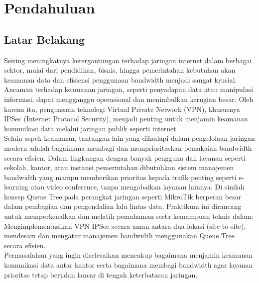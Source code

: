\section{Pendahuluan}
\subsection{Latar Belakang}
Seiring meningkatnya ketergantungan terhadap jaringan internet dalam berbagai sektor, mulai dari pendidikan, bisnis, hingga pemerintahan kebutuhan akan keamanan data dan efisiensi penggunaan bandwidth menjadi sangat krusial. Ancaman terhadap keamanan jaringan, seperti penyadapan data atau manipulasi informasi, dapat mengganggu operasional dan menimbulkan kerugian besar. Oleh karena itu, penguasaan teknologi Virtual Private Network (VPN), khususnya IPSec (Internet Protocol Security), menjadi penting untuk menjamin keamanan komunikasi data melalui jaringan publik seperti internet. \\ Selain aspek keamanan, tantangan lain yang dihadapi dalam pengelolaan jaringan modern adalah bagaimana membagi dan memprioritaskan pemakaian bandwidth secara efisien. Dalam lingkungan dengan banyak pengguna dan layanan seperti sekolah, kantor, atau instansi pemerintahan dibutuhkan sistem manajemen bandwidth yang mampu memberikan prioritas kepada trafik penting seperti e-learning atau video conference, tanpa mengabaikan layanan lainnya. Di sinilah konsep Queue Tree pada perangkat jaringan seperti MikroTik berperan besar dalam pembagian dan pengendalian lalu lintas data. Praktikum ini dirancang untuk memperkenalkan dan melatih pemahaman serta kemampuan teknis dalam: Mengimplementasikan VPN IPSec secara aman antara dua lokasi (site-to-site), mendesain dan mengatur manajemen bandwidth menggunakan Queue Tree secara efisien. \\ Permasalahan yang ingin diselesaikan mencakup bagaimana menjamin keamanan komunikasi data antar kantor serta bagaimana membagi bandwidth agar layanan prioritas tetap berjalan lancar di tengah keterbatasan jaringan.

